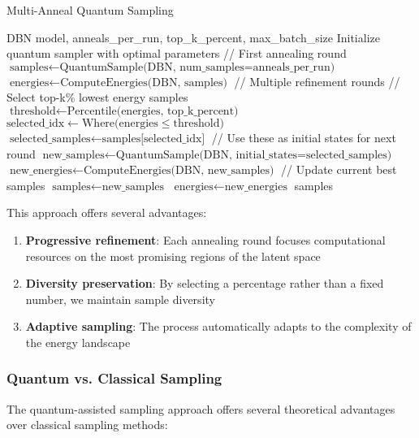 \documentclass[10pt,twocolumn,letterpaper]{article}
\begin{document}
\begin{algorithm}
\caption{Multi-Anneal Quantum Sampling}
\label{alg:multi_anneal}
\begin{algorithmic}[1]
\REQUIRE DBN model, anneals\_per\_run, top\_k\_percent, max\_batch\_size
\STATE Initialize quantum sampler with optimal parameters
\STATE // First annealing round
\STATE $\text{samples} \gets \text{QuantumSample(DBN, num\_samples=anneals\_per\_run)}$
\STATE $\text{energies} \gets \text{ComputeEnergies(DBN, samples)}$
\STATE // Multiple refinement rounds
    \STATE // Select top-k\% lowest energy samples
    \STATE $\text{threshold} \gets \text{Percentile(energies, top\_k\_percent)}$
    \STATE $\text{selected\_idx} \gets \text{Where(energies} \leq \text{threshold)}$
    \STATE $\text{selected\_samples} \gets \text{samples[selected\_idx]}$
    \STATE // Use these as initial states for next round
    \STATE $\text{new\_samples} \gets \text{QuantumSample(DBN, initial\_states=selected\_samples)}$
    \STATE $\text{new\_energies} \gets \text{ComputeEnergies(DBN, new\_samples)}$
    \STATE // Update current best samples
    \STATE $\text{samples} \gets \text{new\_samples}$
    \STATE $\text{energies} \gets \text{new\_energies}$
\ENDFOR
\RETURN samples
\end{algorithmic}
\end{algorithm}

This approach offers several advantages:

\begin{enumerate}
    \item \textbf{Progressive refinement}: Each annealing round focuses computational resources on the most promising regions of the latent space
    \item \textbf{Diversity preservation}: By selecting a percentage rather than a fixed number, we maintain sample diversity
    \item \textbf{Adaptive sampling}: The process automatically adapts to the complexity of the energy landscape
\end{enumerate}

\subsubsection{Quantum vs. Classical Sampling}

The quantum-assisted sampling approach offers several theoretical advantages over classical sampling methods:
\end{document}
